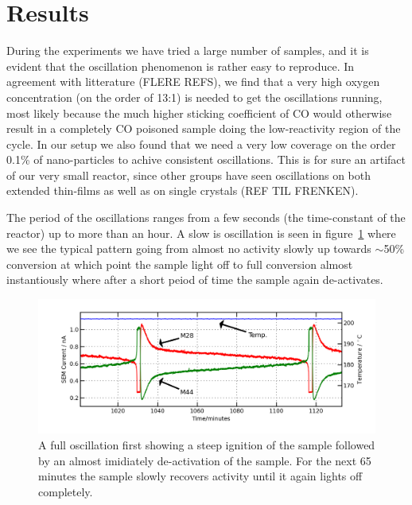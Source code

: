 \documentclass[8.5pt,twoside,twocolumn]{article}
\begin{document}
\section{Results}
During the experiments we have tried a large number of samples, and it is evident that the oscillation phenomenon is rather easy to reproduce. In agreement with litterature\cite{Singh2010} (FLERE REFS), we find that a very high oxygen concentration (on the order of 13:1) is needed to get the oscillations running, most likely because the much higher sticking coefficient of CO would otherwise result in a completely CO poisoned sample doing the low-reactivity region of the cycle. In our setup we also found that we need a very low coverage on the order 0.1\% of nano-particles to achive consistent oscillations. This is for sure an artifact of our very small reactor, since other groups have seen oscillations on both extended thin-films \cite{Singh2010} as well as on single crystals (REF TIL FRENKEN).

The period of the oscillations ranges from a few seconds (the time-constant of the reactor) up to more than an hour. A slow is oscillation is seen in figure~\ref{fgr:full_oscillation} where we see the typical pattern going from almost no activity slowly up towards $\sim$50\% conversion at which point the sample light off to full conversion almost instantiously where after a short peiod of time the sample again de-activates.
\begin{figure}
  \centering
  \includegraphics[width=17cm]{single_full_oscillation.png}
  \caption{A full oscillation first showing a steep ignition of the sample followed by an almost imidiately de-activation of the sample. For the next 65 minutes the sample slowly recovers activity until it again lights off completely.}
  \label{fgr:full_oscillation}
\end{figure}
\end{document}
